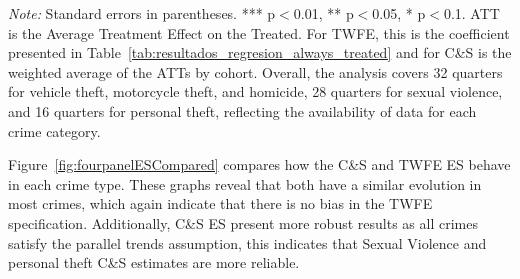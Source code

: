 \documentclass[12pt]{article}
\begin{document}
{\begin{landscape}
\begin{table}[p]
            \vspace{1em}
            \begin{minipage}{\linewidth} %
                \footnotesize
                \textit{Note:} Standard errors in parentheses. *** p$<$0.01, ** p$<$0.05, * p$<$0.1. 
                ATT is the Average Treatment Effect on the Treated. For TWFE, this is the coefficient presented in Table~\ref{tab:resultados_regresion_always_treated} and for C\&S is the weighted average of the ATTs by cohort.
                Overall, the analysis covers 32 quarters for vehicle theft, motorcycle theft, and homicide, 28 quarters for sexual violence, and 16 quarters for personal theft, reflecting the availability of data for each crime category.               
            \end{minipage}
        \end{table}
    \end{landscape}
}

Figure~\ref{fig:fourpanelESCompared} compares how the C\&S and TWFE ES behave in each crime type. These graphs reveal that both have a similar evolution in most crimes, which again indicate that there is no bias in the TWFE specification. Additionally, C\&S ES present more robust results as all crimes satisfy the parallel trends assumption, this indicates that Sexual Violence and personal theft C\&S estimates are more reliable.\\
\end{document}
